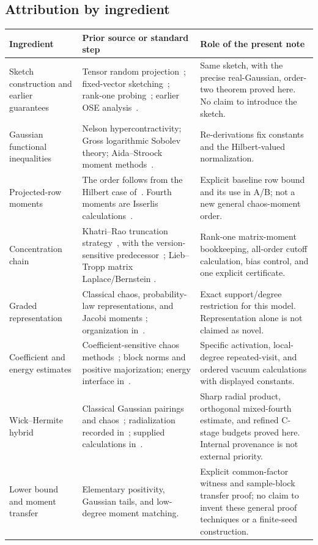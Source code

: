 \documentclass[11pt]{article}
\numberwithin{equation}{section}
\theoremstyle{definition}\newtheorem{definition}[theorem]{Definition}
\theoremstyle{remark}\newtheorem{remark}[theorem]{Remark}
\begin{document}
\subsection{Attribution by ingredient}\label{sec:provenance-table}
\begingroup\small\setlength{\tabcolsep}{5pt}\renewcommand{\arraystretch}{1.2}
\begin{longtable}{@{}P{.23\textwidth}P{.36\textwidth}P{.34\textwidth}@{}}
\toprule
\textbf{Ingredient}&\textbf{Prior source or standard step}&\textbf{Role of the present note}\\
\midrule
Sketch construction and earlier guarantees &
Tensor random projection~\cite{Sun}; fixed-vector sketching~\cite{Ahle};
rank-one probing~\cite{BK}; earlier OSE analysis~\cite{BGKL,BM}. &
Same sketch, with the precise real-Gaussian, order-two theorem proved here.
No claim to introduce the sketch.\\
Gaussian functional inequalities &
Nelson hypercontractivity; Gross logarithmic Sobolev theory;
Aida--Stroock moment methods~\cite{Nelson,Gross,GrossSurvey,AidaStroock}. &
Re-derivations fix constants and the Hilbert-valued normalization.\\
Projected-row moments &
The order follows from the Hilbert case of~\cite[Corollary~12]{ALM}.
Fourth moments are Isserlis calculations~\cite{Isserlis}. &
Explicit baseline row bound and its use in A/B; not a new general chaos-moment
order.\\
Concentration chain &
Khatri--Rao truncation strategy~\cite{BM}, with the version-sensitive
predecessor~\cite{SVBv1,SVBv2}; Lieb--Tropp matrix Laplace/Bernstein
\cite{Lieb,Tropp}. &
Rank-one matrix-moment bookkeeping, all-order cutoff calculation, bias control,
and one explicit certificate.\\
Graded representation &
Classical chaos, probability-law representations, and Jacobi moments
\cite{Wiener,AccardiBozejko,GolubWelsch}; organization in~\cite{Framework}. &
Exact support/degree restriction for this model. Representation alone is not
claimed as novel.\\
Coefficient and energy estimates &
Coefficient-sensitive chaos methods~\cite{ALM,BLNvH}; block norms and positive
majorization; energy interface in~\cite{Framework}. &
Specific activation, local-degree repeated-visit, and ordered vacuum
calculations with displayed constants.\\
Wick--Hermite hybrid &
Classical Gaussian pairings and chaos~\cite{Isserlis,Janson}; radialization
recorded in~\cite{RMPS}; supplied calculations in~\cite{WickNote}. &
Sharp radial product, orthogonal mixed-fourth estimate, and refined C-stage
budgets proved here. Internal provenance is not external priority.\\
Lower bound and moment transfer &
Elementary positivity, Gaussian tails, and low-degree moment matching. &
Explicit common-factor witness and sample-block transfer proof; no claim to
invent these general proof techniques or a finite-seed construction.\\
\bottomrule
\end{longtable}
\endgroup
\end{document}

